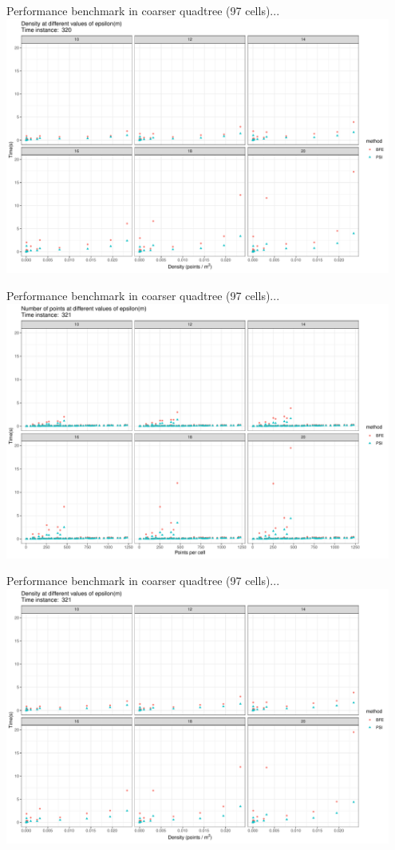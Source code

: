 \documentclass{beamer}
\begin{document}
\begin{frame}{Performance benchmark in coarser quadtree (97 cells)...}
    \centering
    \includegraphics[width=0.95\textwidth]{figures/coarser/psi_density_320}
\end{frame}

\begin{frame}{Performance benchmark in coarser quadtree (97 cells)...}
    \centering
    \includegraphics[width=0.95\textwidth]{figures/coarser/psi_count_321}
\end{frame}

\begin{frame}{Performance benchmark in coarser quadtree (97 cells)...}
    \centering
    \includegraphics[width=0.95\textwidth]{figures/coarser/psi_density_321}
\end{frame}
\end{document}
